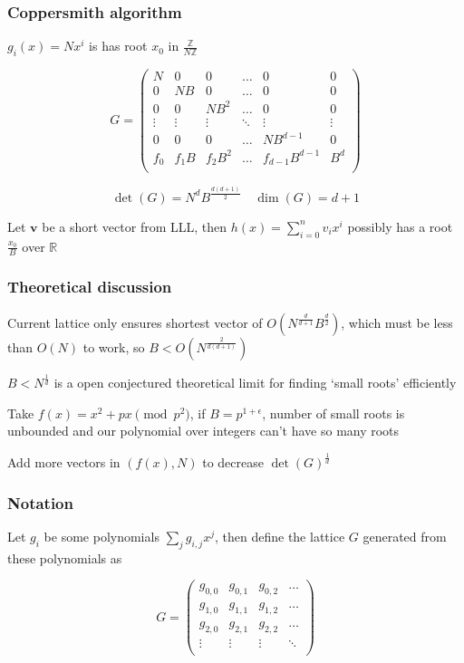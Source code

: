 \documentclass{beamer}
\begin{document}
\begin{frame}
    \frametitle{Coppersmith algorithm}
    $g_i(x)=Nx^i$ is has root $x_0$ in $\frac{\mathbb Z}{N\mathbb Z}$\break 

    $$G=\begin{pmatrix}
        N&0&0&\dots&0&0\\
        0&NB&0&\dots&0&0\\
        0&0&NB^2&\dots&0&0\\
        \vdots&\vdots&\vdots&\ddots&\vdots&\vdots\\
        0&0&0&\dots&NB^{d-1}&0\\
        f_0&f_1B&f_2B^2&\dots&f_{d-1}B^{d-1}&B^d\\
    \end{pmatrix}$$

    $$\det(G)=N^dB^{\frac{d(d+1)}2}\quad\dim(G)=d+1$$

    Let $\mathbf v$ be a short vector from LLL, then $h(x)=\sum_{i=0}^nv_ix^i$ possibly has a root $\frac{x_0}B$ over $\mathbb R$
\end{frame}

\begin{frame}
    \frametitle{Theoretical discussion}
    Current lattice only ensures shortest vector of $O\left(N^{\frac d{d+1}}B^{\frac d2}\right)$, which must be less than $O(N)$ to work, so $B<O\left(N^{\frac2{d(d+1)}}\right)$\break

    $B<N^{\frac1d}$ is a open conjectured theoretical limit for finding `small roots' efficiently

    Take $f(x)=x^2+px\pmod{p^2}$, if $B=p^{1+\epsilon}$, number of small roots is unbounded and our polynomial over integers can't have so many roots\break
    
    Add more vectors in $(f(x),N)$ to decrease $\det(G)^{\frac1d}$
\end{frame}

\begin{frame}
    \frametitle{Notation}
    Let $g_i$ be some polynomials $\sum_jg_{i,j}x^j$, then define the lattice $G$ generated from these polynomials as
    
    $$G=\begin{pmatrix}
        g_{0,0}&g_{0,1}&g_{0,2}&\dots\\
        g_{1,0}&g_{1,1}&g_{1,2}&\dots\\
        g_{2,0}&g_{2,1}&g_{2,2}&\dots\\
        \vdots&\vdots&\vdots&\ddots\\
    \end{pmatrix}$$
\end{frame}
\end{document}
